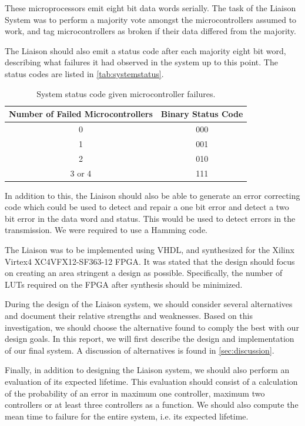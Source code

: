 These microprocessors emit eight bit data words serially. The task of
the Liaison System was to perform a majority vote amongst the
microcontrollers assumed to work, and tag microcontrollers as broken
if their data differed from the majority.

The Liaison should also emit a status code after each majority eight
bit word, describing what failures it had observed in the system up to
this point. The status codes are listed in \autoref{tab:systemstatus}.

\begin{table}[htbp]
  \centering
  \begin{tabular}{|c|c|}
    \hline
    \textbf{Number of Failed Microcontrollers} & \textbf{Binary Status Code} \\ \hline
    0 & 000 \\ \hline
    1 & 001 \\ \hline
    2 & 010 \\ \hline
    3 or 4 & 111 \\ \hline
  \end{tabular}
  \caption{System status code given microcontroller failures.}
  \label{tab:systemstatus}
\end{table}

In addition to this, the Liaison should also be able to generate an
error correcting code which could be used to detect and repair a one
bit error and detect a two bit error in the data word and status. This
would be used to detect errors in the transmission. We were required
to use a Hamming code\cite{task}\cite{ecc}.

The Liaison was to be implemented using VHDL, and synthesized for the
Xilinx Virtex4 XC4VFX12-SF363-12 FPGA. It was stated that the design
should focus on creating an area stringent a design as
possible. Specifically, the number of LUTs required on the FPGA after
synthesis should be minimized.

During the design of the Liaison system, we should consider several
alternatives and document their relative strengths and
weaknesses. Based on this investigation, we should choose the
alternative found to comply the best with our design goals. In this
report, we will first describe the design and implementation of our
final system. A discussion of alternatives is found in
\autoref{sec:discussion}.

Finally, in addition to designing the Liaison system, we should also
perform an evaluation of its expected lifetime. This evaluation should
consist of a calculation of the probability of an error in maximum one
controller, maximum two controllers or at least three controllers as a
function. We should also compute the mean time to failure for the
entire system, i.e. its expected lifetime.
